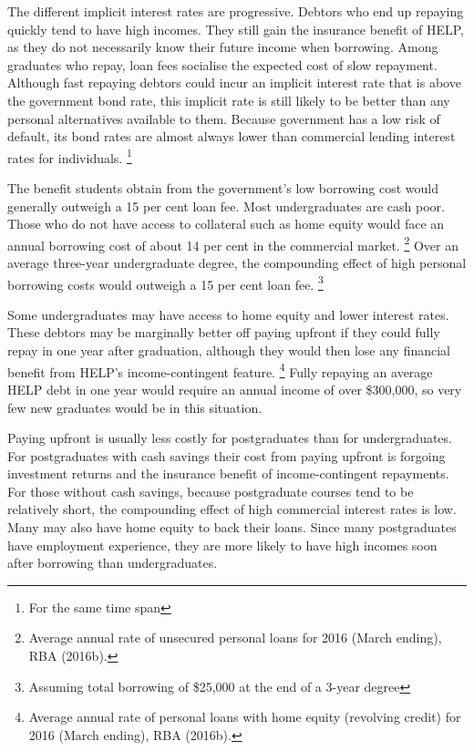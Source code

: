\documentclass[embargoed]{grattan}
\begin{document}
The different implicit interest rates are progressive.
Debtors who end up repaying quickly tend to have high incomes.
They still gain the insurance benefit of \gls{HELP}, as they do not necessarily know their future income when borrowing.
Among graduates who repay, loan fees socialise the expected cost of slow repayment.
Although fast repaying debtors could incur an implicit interest rate that is above the government bond rate, this implicit rate is still likely to be better than any personal alternatives available to them.
Because government has a low risk of default, its bond rates are almost always lower than commercial lending interest rates for individuals.%
\footnote{For the same time span}

The benefit students obtain from the government's low borrowing cost would generally outweigh a 15 per cent loan fee.
Most undergraduates are cash poor.
Those who do not have access to collateral such as home equity would face an annual borrowing cost of about 14 per cent in the commercial market.%
\footnote{Average annual rate of unsecured personal loans for 2016 (March ending), RBA (2016b).} Over an average three-year undergraduate degree, the compounding effect of high personal borrowing costs would outweigh a 15 per cent loan fee.%
\footnote{Assuming total borrowing of \$25,000 at the end of a 3-year degree}

Some undergraduates may have access to home equity and lower interest rates.
These debtors may be marginally better off paying upfront if they could fully repay in one year after graduation, although they would then lose any financial benefit from \gls{HELP}'s income-contingent feature.%
\footnote{Average annual rate of personal loans with home equity (revolving credit) for 2016 (March ending), RBA (2016b).} Fully repaying an average \gls{HELP} debt in one year would require an annual income of over \$300,000, so very few new graduates would be in this situation.

Paying upfront is usually less costly for postgraduates than for undergraduates.
For postgraduates with cash savings their cost from paying upfront is forgoing investment returns and the insurance benefit of income-contingent repayments.
For those without cash savings, because postgraduate courses tend to be relatively short, the compounding effect of high commercial interest rates is low.
Many may also have home equity to back their loans.
Since many postgraduates have employment experience, they are more likely to have high incomes soon after borrowing than undergraduates.
\end{document}
